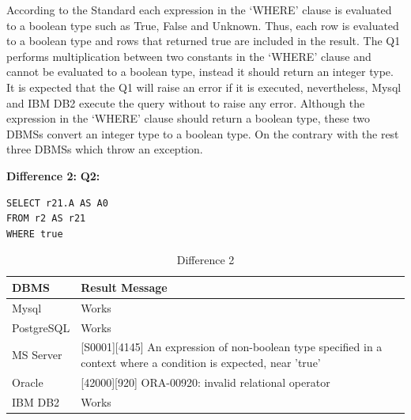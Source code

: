 According to the Standard each expression in the ‘WHERE’ clause is evaluated to a boolean type such as True, False and Unknown. Thus, each row is evaluated to a boolean type and rows that returned true are included in the result. The Q1 performs multiplication between two constants in the ‘WHERE’ clause and cannot be evaluated to a boolean type, instead it should return an integer type. It is expected that the Q1 will raise an error if it is executed, nevertheless, Mysql and IBM DB2 execute the query without to raise any error. Although the expression in the ‘WHERE’ clause should return a boolean type, these two DBMSs convert an integer type to a boolean type. On the contrary with the rest three DBMSs which throw an exception.  

\hfill\newline\textbf{Difference 2:}
\hfill\newline\textbf{Q2:}
\begin{mdframed}[backgroundcolor=lightgray!20] 
\begin{lstlisting}[style=SQL]
SELECT r21.A AS A0 
FROM r2 AS r21
WHERE true
\end{lstlisting}
\end{mdframed}
 
 
\begin{table}[h]
\centering
\caption{Difference 2}
\label{my-label}
\begin{tabular}{|p{2cm}|p{11.5cm}| }
\hline
\textbf{DBMS} & \textbf{Result Message}                                                                                                   \\ \hline
Mysql         & Works                                                                                                                     \\ \hline
PostgreSQL    & Works                                                                                                                     \\ \hline
MS Server     & {[}S0001{]}{[}4145{]} An expression of non-boolean type specified in a context where a condition is expected, near 'true' \\ \hline
Oracle        & {[}42000{]}{[}920{]} ORA-00920: invalid relational operator                                                               \\ \hline
IBM DB2       & Works                                                                                                                     \\ \hline
\end{tabular}
\end{table}


